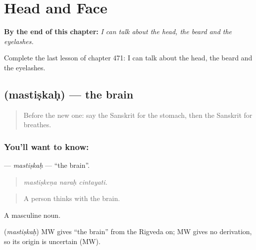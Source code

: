 
\chapter{Head and Face}
\label{ch:sa-head-and-face}

\begin{chapteropening}
\textbf{By the end of this chapter:} \emph{I can talk about the head, the beard and the eyelashes.}

Complete the last lesson of chapter 471: I can talk about the head, the beard and the eyelashes.
\end{chapteropening}

\section[\texorpdfstring{\sk{मस्तिष्कः} (mastiṣkaḥ)}{मस्तिष्कः (mastiṣkaḥ)}]{ (mastiṣkaḥ) — the brain}

\label{lesson:SA-C471-mastiskah}



\begin{quote}
Before the new one: say the Sanskrit for the stomach, then the Sanskrit for breathes.
\end{quote}

\subsection*{You'll want to know: }
\textbf{} — \emph{mastiṣkaḥ} — \textquotedblleft{}the brain\textquotedblright{}.

\begin{quote}
  
\end{quote}

\begin{quote}
\emph{mastiṣkeṇa naraḥ cintayati.}
\end{quote}

\begin{quote}
A person thinks with the brain.
\end{quote}

A masculine noun.

\begin{cousinweb}
\textbf{} (\emph{mastiṣkaḥ}) MW gives \textquotedblleft{}the brain\textquotedblright{} from the Rigveda on; MW gives no derivation, so its origin is uncertain (MW).
\end{cousinweb}

